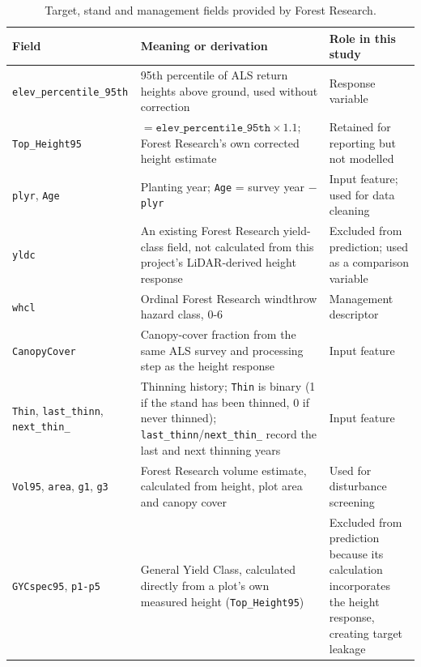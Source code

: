 \documentclass[logo,msc,ai]{infthesis}           %
\begin{document}
\begin{table}[!htbp]
\scriptsize

\setlength{\tabcolsep}{3pt}
\renewcommand{\arraystretch}{0.95}
\begin{tabular}{
    >{\raggedright\arraybackslash}p{2.6cm}
    >{\raggedright\arraybackslash}p{7.0cm}
    >{\raggedright\arraybackslash}p{3.2cm}
}
\hline
Field & Meaning or derivation & Role in this study \\
\hline
\texttt{elev\_\allowbreak percentile\_\allowbreak 95th} & 95th percentile of ALS return heights above ground, used without correction & Response variable \\
\texttt{Top\_Height95} & $=\texttt{elev\_percentile\_95th}\times1.1$; Forest Research's own corrected height estimate & Retained for reporting but not modelled \\
\texttt{plyr}, \texttt{Age} & Planting year; \texttt{Age} = survey year $-$ \texttt{plyr} & Input feature; used for data cleaning \\
\texttt{yldc} & An existing Forest Research yield-class field, not calculated from this project's LiDAR-derived height response & Excluded from prediction; used as a comparison variable \\
\texttt{whcl} & Ordinal Forest Research windthrow hazard class, 0-6 & Management descriptor \\
\texttt{CanopyCover} & Canopy-cover fraction from the same ALS survey and processing step as the height response & Input feature \\
\texttt{Thin}, \texttt{last\_thinn}, \texttt{next\_thin\_} & Thinning history; \texttt{Thin} is binary (1 if the stand has been thinned, 0 if never thinned); \texttt{last\_thinn}/\texttt{next\_thin\_} record the last and next thinning years & Input feature \\
\texttt{Vol95}, \texttt{area}, \texttt{g1}, \texttt{g3} & Forest Research volume estimate, calculated from height, plot area and canopy cover & Used for disturbance screening \\
\texttt{GYCspec95}, \texttt{p1-p5} & General Yield Class, calculated directly from a plot's own measured height (\texttt{Top\_Height95}) & Excluded from prediction because its calculation
incorporates the height response, creating target leakage \\
\hline
\end{tabular}
\caption{\small{Target, stand and management fields provided by Forest Research.}}
\label{tab:data-fields}
\end{table}
\end{document}
